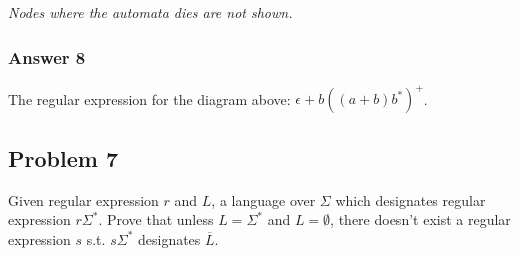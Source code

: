 \documentclass[11pt]{article}
\begin{document}

\emph{Nodes where the automata dies are not shown.}

\subsubsection{Answer 8}
\label{sec:orgheadline14}
The regular expression for the diagram above: \(\epsilon + b((a + b)b^*)^+\).

\subsection{Problem 7}
\label{sec:orgheadline16}
Given regular expression \(r\) and \(L\), a language over \(\Sigma\) which
designates regular expression \(r\Sigma^*\).  Prove that unless \(L = \Sigma^*\)
and \(L = \emptyset\), there doesn't exist a regular expression \(s\) s.t.
\(s\Sigma^*\) designates \(\overline{L}\).
\end{document}
